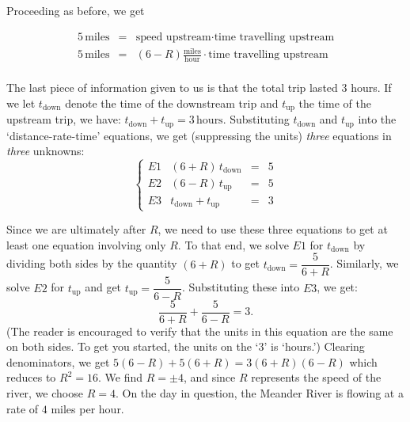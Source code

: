 {Proceeding as before, we get
 
 \[ \begin{array}{rcl}

5 \, \text{miles} & = & \text{speed upstream} \cdot \text{time travelling upstream} \\ 

5 \, \text{miles} & = & (6 - R) \frac{\text{miles}}{\text{hour}} \cdot \text{time travelling upstream} \\ 	\end{array} \]
 
The last piece of information given to us is that the total trip lasted $3$ hours.  If we let $t_{\text{down}}$ denote the time of the downstream trip and $t_{\text{up}}$ the time of the upstream trip, we have:    $t_{\text{down}} + t_{\text{up}} = 3 \, \text{hours}$.  Substituting $t_{\text{down}}$ and $t_{\text{up}}$ into the `distance-rate-time' equations, we get (suppressing the units) \textit{three} equations in \textit{three} unknowns:
 \[\left\{\begin{array}{lrcl}   E1 & (6+R) \, t_{\text{down}} & = & 5 \\ E2 & (6-R) \, t_{\text{up}} & = & 5 \\ E3 & t_{\text{down}} + t_{\text{up}} & = & 3 \end{array} \right.\]



Since we are ultimately after $R$, we need to use these three equations to get at least one equation involving only $R$.  To that end, we solve $E1$ for $t_{\text{down}}$ by dividing both sides by the quantity $(6+R)$ to get $t_{\text{down}} = \dfrac{5}{6+R}$.   Similarly, we solve $E2$ for $t_{\text{up}}$ and get $t_{\text{up}} = \dfrac{5}{6-R}$. Substituting these into $E3$, we get: \[\dfrac{5}{6+R} + \dfrac{5}{6 - R} = 3.\] 
(The reader is encouraged to verify that the units in this equation are the same on both sides.  To get you started, the units on the `3' is `hours.') Clearing denominators, we get $5(6-R) + 5(6+R) = 3(6+R)(6-R)$ which reduces to  $R^2 = 16$.   We find $R = \pm 4$, and since $R$ represents the speed of the river, we choose $R = 4$.   On the day in question, the Meander River is flowing at a rate of $4$ miles per hour. 


}

